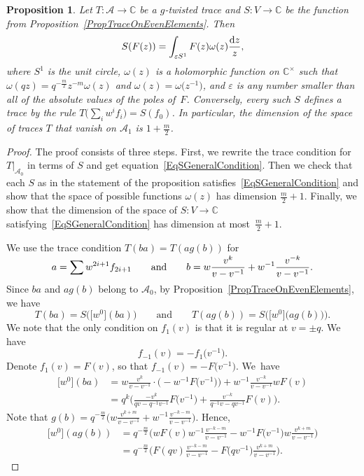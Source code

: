 \documentclass[pdftex]{sigma}
\newcommand\CC{\mathbb{C}}
\newcommand\eps{\varepsilon}
\newcommand{\mc}{\mathcal}
\numberwithin{equation}{section}
\newtheorem{Proposition}[Theorem]{Proposition}
\theoremstyle{definition}
\begin{document}
\begin{Proposition}
\label{PropSIsAnINtegral}
 Let $T\colon\mc{A}\to \CC$ be a $g$-twisted trace and $S\colon V\to \CC$ be the function from Proposition~{\rm\ref{PropTraceOnEvenElements}}. Then
 \[S(F(z))=\int_{\eps S^1}F(z)\omega(z)\frac{{\rm d}z}{z},\] where $S^1$ is the unit circle, $\omega(z)$ is a holomorphic function on $\CC^{\times}$ such that $\omega(qz)=q^{-\frac{m}{2}}z^{-m}\omega(z)$ and $\omega(z)=\omega\bigl(z^{-1}\bigr)$, and $\eps$ is any number smaller than all of the absolute values of the poles of~$F$. Conversely, every such $S$ defines a trace by the rule $T\bigl(\sum_i w^i f_i\bigr)=S(f_0)$. In particular, the dimension of the space of traces $T$ that vanish on $\mc{A}_1$ is $1+\frac{m}{2}$.
\end{Proposition}
\begin{proof}
 The proof consists of three steps. First, we rewrite the trace condition for $T|_{\mc{A}_0}$ in terms of $S$ and get equation~\eqref{EqSGeneralCondition}. Then we check that each $S$ as in the statement of the proposition satisfies~\eqref{EqSGeneralCondition} and show that the space of possible functions $\omega(z)$ has dimension $\frac{m}{2}+1$. Finally, we show that the dimension of the space of $S\colon V\to \CC$ satisfying~\eqref{EqSGeneralCondition} has dimension at most~${\frac{m}{2}+1}$.

 We use the trace condition $T(ba)=T(ag(b))$ for
 \[
 a=\sum w^{2i+1}f_{2i+1} \qquad \text{and} \qquad b=w\smash{\frac{v^k}{v-v^{-1}}}+w^{-1}\smash{\frac{v^{-k}}{v-v^{-1}}}.
 \]
 Since $ba$ and $ag(b)$ belong to $\mc{A}_0$, by Proposition~\ref{PropTraceOnEvenElements}, we have
 \[
 T(ba)=S\bigl(\big[w^0\big](ba)\bigr) \qquad \text{and} \qquad T(ag(b))=S\bigl(\big[w^0\big]\bigl(ag(b)\bigr)\bigr).
 \]
 We note that the only condition on $f_1(v)$ is that it is regular at $v=\pm q$. We have
 \[
 f_{-1}(v)=-f_1\bigl(v^{-1}\bigr).
 \]
  Denote $f_1(v)=F(v)$, so that $f_{-1}(v)=-F\bigl(v^{-1}\bigr)$. We~have
 \begin{align*}
 \big[w^0\big](ba)&=w\frac{v^k}{v-v^{-1}}\cdot\bigl(-w^{-1}F\bigl(v^{-1}\bigr)\bigr)+w^{-1}\frac{v^{-k}}{v-v^{-1}}wF(v)\\
 &=q^k\bigg(\frac{-v^k}{qv-q^{-1}v^{-1}}F\bigl(v^{-1}\bigr)+\frac{v^{-k}}{q^{-1}v-qv^{-1}}F(v)\bigg).
 \end{align*}
 Note that $g(b)=q^{-\frac{m}2}\bigl(w\frac{v^{k+m}}{v-v^{-1}}+w^{-1}\frac{v^{-k-m}}{v-v^{-1}}\bigr)$. Hence,
 \begin{align*}
 \big[w^0\big](ag(b))&=q^{-\frac{m}{2}}\bigg(wF(v)w^{-1}\frac{v^{-k-m}}{v-v^{-1}}-w^{-1}F\bigl(v^{-1}\bigr)w\frac{v^{k+m}}{v-v^{-1}}\bigg)\\
 &=q^{-\frac{m}2}\bigg(F(qv)\frac{v^{-k-m}}{v-v^{-1}}-F\bigl(qv^{-1}\bigr)\frac{v^{k+m}}{v-v^{-1}}\bigg).
 \end{align*}


\end{proof}
\end{document}
